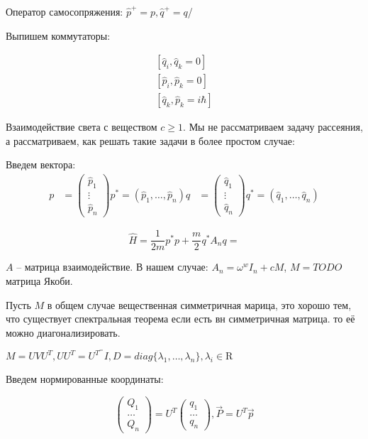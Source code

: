Оператор самосопряжения: $\hat p^+=p, \hat q^+=q$/

Выпишем коммутаторы:

\begin{equation}
    \begin{align}
    [\hat q_i,\hat q_k = 0] \\
    [\hat p_i,\hat p_k = 0] \\
    [\hat q_k,\hat p_k = i\hbar]
    \end{align}
\end{equation}

Взаимодействие света с веществом $c\geq 1$. Мы не рассматриваем задачу рассеяния,
а рассматриваем, как решать такие задачи в более простом случае:

Введем вектора:
\begin{equation}
    \begin{align}
    p & = \left( \begin{matrix} \hat p_1 \\ \vdots \\ \hat p_n\end{matrix}\right) p^*=(\hat p_1,\ldots,\hat p_n)
    q & = \left( \begin{matrix} \hat q_1 \\ \vdots \\ \hat q_n\end{matrix}\right) q^*=(\hat q_1,\ldots,\hat q_n)
    \end{align}
\end{equation}

\begin{equation}
    \hat H = \frac{1}{2m} p^*p + \frac{m}{2}q^* A_n q =
\end{equation}

$A$ -- матрица взаимодействие. В нашем случае:
$A_n = \omega^w I_n + cM$,  $M=TODO$ матрица Якоби.

Пусть $M$ в общем случае вещественная симметричная марица, это хорошо тем, что существует спектральная
теорема если есть вн симметричная матрица. то её можно диагонализировать.

$M = U V U^T, UU^T=U^T^=I, D=diag\{\lambda_1,\ldots,\lambda_n\}, \lambda_i\in\mathrm R$

Введем нормированные координаты: 

\begin{equation}
    \left( \begin{matrix} Q_1 \\ \ldots \\ Q_n\end{matrix}\right) 
    = U^T \left( \begin{matrix} q_1 \\ \ldots \\ q_n\end{matrix}\right), \vec{P} = U^T \vec{p}
\end{equation}

